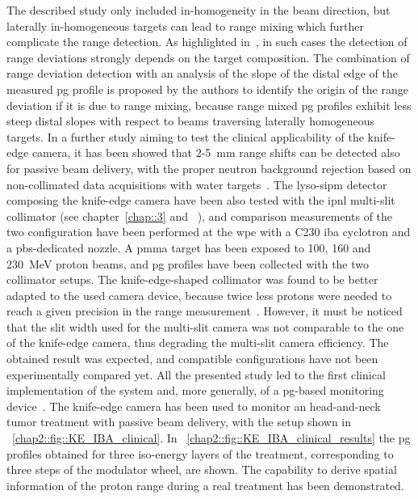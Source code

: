The described study only included in-homogeneity in the beam direction, but laterally in-homogeneous targets can lead to range mixing which further complicate the range detection. As highlighted in~\cite{Priegnitz2016}, in such cases the detection of range deviations strongly depends on the target composition. The combination of range deviation detection with an analysis of the slope of the distal edge of the measured \gls{pg} profile is proposed by the authors to identify the origin of the range deviation if it is due to range mixing, because range mixed \gls{pg} profiles exhibit less steep distal slopes with respect to beams traversing laterally homogeneous targets. In a further study aiming to test the clinical applicability of the knife-edge camera, it has been showed that 2-5~mm range shifts can be detected also for passive beam delivery, with the proper neutron background rejection based on non-collimated data acquisitions with water targets~\parencite{Priegnitz2016}. The \gls{lyso}-\gls{sipm} detector composing the knife-edge camera have been also tested with the \gls{ipnl} multi-slit collimator (see chapter~\ref{chap::3} and ~\cite{Pinto2014}), and comparison measurements of the two configuration have been performed at the \gls{wpe} with a C230 \gls{iba} cyclotron and a \gls{pbs}-dedicated nozzle. A \gls{pmma} target has been exposed to 100, 160 and 230~MeV proton beams, and \gls{pg} profiles have been collected with the two collimator setups. The knife-edge-shaped collimator was found to be better adapted to the used camera device, because twice less protons were needed to reach a given precision in the range measurement~\parencite{Smeets2016}. However, it must be noticed that the slit width used for the multi-slit camera was not comparable to the one of the knife-edge camera, thus degrading the multi-slit camera efficiency. The obtained result was expected, and compatible configurations have not been experimentally compared yet.
All the presented study led to the first clinical implementation of the system and, more generally, of a \gls{pg}-based monitoring device~\parencite{Richter2016}. The knife-edge camera has been used to monitor an head-and-neck tumor treatment with passive beam delivery, with the setup shown in \figurename~\ref{chap2::fig::KE_IBA_clinical}. In \figurename~\ref{chap2::fig::KE_IBA_clinical_results} the \gls{pg} profiles obtained for three iso-energy layers of the treatment, corresponding to three steps of the modulator wheel, are shown. The capability to derive spatial information of the proton range during a real treatment has been demonstrated.

